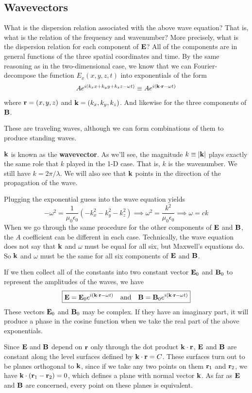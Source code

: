 \subsection*{Wavevectors}
What is the dispersion relation associated with the above wave equation? That is, what is the relation of the frequency and wavenumber? More precisely, what is the dispersion relation for each component of $\mathbf{E}$? All of the components are in general functions of the three spatial coordinates and time. By the same reasoning as in the two-dimensional case, we know that we can Fourier-decompose the function $E_x(x,y,z,t)$ into exponentials of the form
\[ Ae^{i(k_xx+k_yy+k_zz-\omega t)} \equiv Ae^{i(\mathbf{k} \cdot \mathbf{r} - \omega t)}\]
where $\mathbf{r} = (x,y,z)$ and $\mathbf{k} = (k_x, k_y, k_z)$. And likewise for the three components of $\mathbf{B}$.

These are traveling waves, although we can form combinations of them to produce standing waves.

$\mathbf{k}$ is known as the \textbf{wavevector}. As we'll see, the magnitude $k \equiv \abs{\mathbf{k}}$ plays exactly the same role that $k$ played in the 1-D case. That is, $k$ is the wavenumber. We still have $k = 2\pi/\lambda$. We will also see that $\mathbf{k}$ points in the direction of the propagation of the wave. 

Plugging the exponential guess into the wave equation yields
\[ -\omega^2 = \frac{1}{\mu_0\epsilon_0}(-k_x^2-k_y^2-k_z^2) \implies \omega^2 = \frac{k^2}{\mu_0\epsilon_0} \implies \boxed{\omega = ck} \]
When we go through the same procedure for the other components of $\mathbf{E}$ and $\mathbf{B}$, the $A$ coefficient can be different in each case. Technically, the wave equation does not say that $\mathbf{k}$ and $\omega$ must be equal for all six, but Maxwell's equations do. So $\mathbf{k}$ and $\omega$ must be the same for all six components of $\mathbf{E}$ and $\mathbf{B}$.

If we then collect all of the constants into two constant vector $\mathbf{E}_0$ and $\mathbf{B}_0$ to represent the amplitudes of the waves, we have
\[ \boxed{\mathbf{E} = \mathbf{E}_0 e^{i(\mathbf{k} \cdot \mathbf{r} - \omega t)} \quad\text{and}\quad \mathbf{B} = \mathbf{B}_0 e^{i(\mathbf{k}\cdot \mathbf{r} - \omega t)}} \]
These vectors $\mathbf{E}_0$ and $\mathbf{B}_0$ may be complex. If they have an imaginary part, it will produce a phase in the cosine function when we take the real part of the above exponentials. 

Since $\mathbf{E}$ and $\mathbf{B}$ depend on $\mathbf{r}$ only through the dot product $\mathbf{k} \cdot \mathbf{r}$, $\mathbf{E}$ and $\mathbf{B}$ are constant along the level surfaces defined by $\mathbf{k} \cdot \mathbf{r} = C$. These surfaces turn out to be planes orthogonal to $\mathbf{k}$, since if we take any two points on them $\mathbf{r}_1$ and $\mathbf{r}_2$, we have $\mathbf{k} \cdot (\mathbf{r}_1 - \mathbf{r}_2) = 0$, which defines a plane with normal vector $\mathbf{k}$. As far as $\mathbf{E}$ and $\mathbf{B}$ are concerned, every point on these planes is equivalent.

